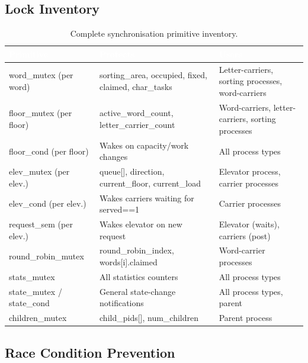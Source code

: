 \documentclass[12pt,a4paper]{article}
\begin{document}
\subsection{Lock Inventory}

\begin{table}[h!]
\centering
\caption{Complete synchronisation primitive inventory.}
\begin{tabularx}{\textwidth}{>{\ttfamily}l l X}
\toprule
\rowcolor{darkblue}
\textcolor{white}{Primitive} &
\textcolor{white}{Protects} &
\textcolor{white}{Users} \\
\midrule
word\_mutex (per word) &
  sorting\_area, occupied, fixed, claimed, char\_tasks &
  Letter-carriers, sorting processes, word-carriers \\
\rowcolor{rowgray}
floor\_mutex (per floor) &
  active\_word\_count, letter\_carrier\_count &
  Word-carriers, letter-carriers, sorting processes \\
floor\_cond (per floor) &
  Wakes on capacity/work changes &
  All process types \\
\rowcolor{rowgray}
elev\_mutex (per elev.) &
  queue[], direction, current\_floor, current\_load &
  Elevator process, carrier processes \\
elev\_cond (per elev.) &
  Wakes carriers waiting for served==1 &
  Carrier processes \\
\rowcolor{rowgray}
request\_sem (per elev.) &
  Wakes elevator on new request &
  Elevator (waits), carriers (post) \\
round\_robin\_mutex &
  round\_robin\_index, words[i].claimed &
  Word-carrier processes \\
\rowcolor{rowgray}
stats\_mutex &
  All statistics counters &
  All process types \\
state\_mutex / state\_cond &
  General state-change notifications &
  All process types, parent \\
\rowcolor{rowgray}
children\_mutex &
  child\_pids[], num\_children &
  Parent process \\
\bottomrule
\end{tabularx}
\end{table}

\subsection{Race Condition Prevention}
\end{document}

